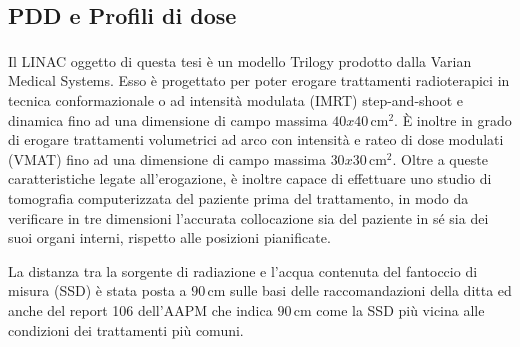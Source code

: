 \subsection{PDD e Profili di dose}
Il LINAC oggetto di questa tesi è un modello Trilogy\textsuperscript{\textcopyright} prodotto dalla Varian Medical Systems. Esso è progettato per poter erogare trattamenti radioterapici in tecnica conformazionale o ad intensità modulata (IMRT) step-and-shoot e dinamica fino ad una dimensione di campo massima $40x40\,$cm$^2$. \`E inoltre in grado di erogare trattamenti volumetrici ad arco con intensità e rateo di dose modulati (VMAT) fino ad una dimensione di campo massima $30x30\,$cm$^2$. Oltre a queste caratteristiche legate all'erogazione, è inoltre capace di effettuare uno studio di tomografia computerizzata del paziente prima del trattamento, in modo da verificare in tre dimensioni l'accurata collocazione sia del paziente in sé sia dei suoi organi interni, rispetto alle posizioni pianificate.

La distanza tra la sorgente di radiazione e l'acqua contenuta del fantoccio di misura (SSD) è stata posta a $90\,$cm sulle basi delle raccomandazioni della ditta ed anche del report 106 dell'AAPM \cite{Das2008a} che indica $90\,$cm come la SSD più vicina alle condizioni dei trattamenti più comuni.

